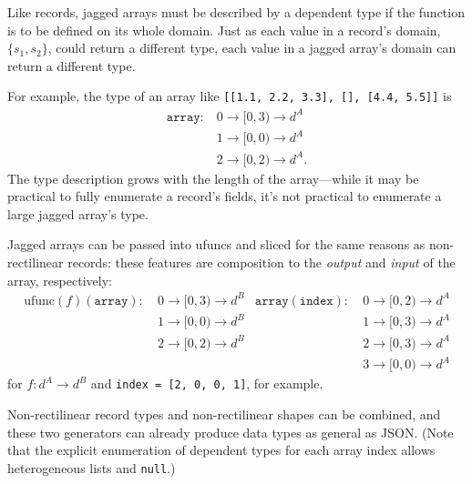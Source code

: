 \documentclass[12pt]{article}
\begin{document}
Like records, jagged arrays must be described by a dependent type if the function is to be defined on its whole domain. Just as each value in a record's domain, $\{s_1, s_2\}$, could return a different type, each value in a jagged array's domain can return a different type.

For example, the type of an array like \texttt{[[1.1, 2.2, 3.3], [], [4.4, 5.5]]} is
\begin{align*}
\texttt{array}: &\ 0 \to [0, 3) \to d^A \\
 &\ 1 \to [0, 0) \to d^A \\
 &\ 2 \to [0, 2) \to d^A\mbox{.}
\end{align*}
\noindent The type description grows with the length of the array---while it may be practical to fully enumerate a record's fields, it's not practical to enumerate a large jagged array's type.

Jagged arrays can be passed into ufuncs and sliced for the same reasons as non-rectilinear records: these features are composition to the {\it output} and {\it input} of the array, respectively:
\begin{align*}
\mbox{ufunc}(f)(\texttt{array}): &\ 0 \to [0, 3) \to d^B & \texttt{array}(\texttt{index}): &\ 0 \to [0, 2) \to d^A \\
 &\ 1 \to [0, 0) \to d^B                                             & &\ 1 \to [0, 3) \to d^A \\
 &\ 2 \to [0, 2) \to d^B                                             & &\ 2 \to [0, 3) \to d^A \\
 &                                                                   & &\ 3 \to [0, 0) \to d^A
\end{align*}
\noindent for $f: d^A \to d^B$ and \texttt{index = [2, 0, 0, 1]}, for example.

Non-rectilinear record types and non-rectilinear shapes can be combined, and these two generators can already produce data types as general as JSON. (Note that the explicit enumeration of dependent types for each array index allows heterogeneous lists and \texttt{null}.)
\end{document}
